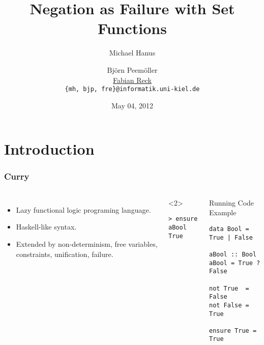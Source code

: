 \documentclass[utf8]{beamer}
\begin{document}
\title{Negation as Failure with Set Functions}

\date{May 04, 2012}

\author[M. Hanus, B. Peemöller, \underline{F. Reck}]
 { Michael Hanus \and Björn Peemöller\\
            \underline{Fabian Reck} \\
  \texttt{\{mh, bjp, fre\}@informatik.uni-kiel.de}}


\begin{frame}
\titlepage
\end{frame}

\section{Introduction}

\begin{frame}[fragile]
\frametitle{Curry}
\begin{columns}[t]
\begin{itemize}
\item Lazy functional logic programing language.
\item Haskell-like syntax.
\item Extended by non-determinism, free variables, constraints, unification,
      failure.
\end{itemize}
\begin{example}<2>
\begin{lstlisting}
> ensure aBool
True
\end{lstlisting}
\end{example}
\begin{block}{Running Code Example}
\begin{lstlisting}
data Bool = True | False

aBool :: Bool
aBool = True ? False

not True  = False
not False = True

ensure True = True
\end{lstlisting}
\end{block}
\end{columns}
\end{frame}
\end{document}
